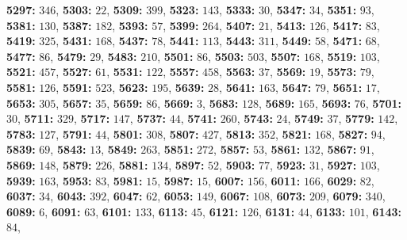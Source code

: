 \textsf{\bfseries 5297:} $346$, \textsf{\bfseries 5303:} $22$, \textsf{\bfseries 5309:} $399$, \textsf{\bfseries 5323:} $143$, \textsf{\bfseries 5333:} $30$, \textsf{\bfseries 5347:} $34$, \textsf{\bfseries 5351:} $93$, \textsf{\bfseries 5381:} $130$, \textsf{\bfseries 5387:} $182$, \textsf{\bfseries 5393:} $57$, \textsf{\bfseries 5399:} $264$, \textsf{\bfseries 5407:} $21$, \textsf{\bfseries 5413:} $126$, \textsf{\bfseries 5417:} $83$, \textsf{\bfseries 5419:} $325$, \textsf{\bfseries 5431:} $168$, \textsf{\bfseries 5437:} $78$, \textsf{\bfseries 5441:} $113$, \textsf{\bfseries 5443:} $311$, \textsf{\bfseries 5449:} $58$, \textsf{\bfseries 5471:} $68$, \textsf{\bfseries 5477:} $86$, \textsf{\bfseries 5479:} $29$, \textsf{\bfseries 5483:} $210$, \textsf{\bfseries 5501:} $86$, \textsf{\bfseries 5503:} $503$, \textsf{\bfseries 5507:} $168$, \textsf{\bfseries 5519:} $103$, \textsf{\bfseries 5521:} $457$, \textsf{\bfseries 5527:} $61$, \textsf{\bfseries 5531:} $122$, \textsf{\bfseries 5557:} $458$, \textsf{\bfseries 5563:} $37$, \textsf{\bfseries 5569:} $19$, \textsf{\bfseries 5573:} $79$, \textsf{\bfseries 5581:} $126$, \textsf{\bfseries 5591:} $523$, \textsf{\bfseries 5623:} $195$, \textsf{\bfseries 5639:} $28$, \textsf{\bfseries 5641:} $163$, \textsf{\bfseries 5647:} $79$, \textsf{\bfseries 5651:} $17$, \textsf{\bfseries 5653:} $305$, \textsf{\bfseries 5657:} $35$, \textsf{\bfseries 5659:} $86$, \textsf{\bfseries 5669:} $3$, \textsf{\bfseries 5683:} $128$, \textsf{\bfseries 5689:} $165$, \textsf{\bfseries 5693:} $76$, \textsf{\bfseries 5701:} $30$, \textsf{\bfseries 5711:} $329$, \textsf{\bfseries 5717:} $147$, \textsf{\bfseries 5737:} $44$, \textsf{\bfseries 5741:} $260$, \textsf{\bfseries 5743:} $24$, \textsf{\bfseries 5749:} $37$, \textsf{\bfseries 5779:} $142$, \textsf{\bfseries 5783:} $127$, \textsf{\bfseries 5791:} $44$, \textsf{\bfseries 5801:} $308$, \textsf{\bfseries 5807:} $427$, \textsf{\bfseries 5813:} $352$, \textsf{\bfseries 5821:} $168$, \textsf{\bfseries 5827:} $94$, \textsf{\bfseries 5839:} $69$, \textsf{\bfseries 5843:} $13$, \textsf{\bfseries 5849:} $263$, \textsf{\bfseries 5851:} $272$, \textsf{\bfseries 5857:} $53$, \textsf{\bfseries 5861:} $132$, \textsf{\bfseries 5867:} $91$, \textsf{\bfseries 5869:} $148$, \textsf{\bfseries 5879:} $226$, \textsf{\bfseries 5881:} $134$, \textsf{\bfseries 5897:} $52$, \textsf{\bfseries 5903:} $77$, \textsf{\bfseries 5923:} $31$, \textsf{\bfseries 5927:} $103$, \textsf{\bfseries 5939:} $163$, \textsf{\bfseries 5953:} $83$, \textsf{\bfseries 5981:} $15$, \textsf{\bfseries 5987:} $15$, \textsf{\bfseries 6007:} $156$, \textsf{\bfseries 6011:} $166$, \textsf{\bfseries 6029:} $82$, \textsf{\bfseries 6037:} $34$, \textsf{\bfseries 6043:} $392$, \textsf{\bfseries 6047:} $62$, \textsf{\bfseries 6053:} $149$, \textsf{\bfseries 6067:} $108$, \textsf{\bfseries 6073:} $209$, \textsf{\bfseries 6079:} $340$, \textsf{\bfseries 6089:} $6$, \textsf{\bfseries 6091:} $63$, \textsf{\bfseries 6101:} $133$, \textsf{\bfseries 6113:} $45$, \textsf{\bfseries 6121:} $126$, \textsf{\bfseries 6131:} $44$, \textsf{\bfseries 6133:} $101$, \textsf{\bfseries 6143:} $84$, 
